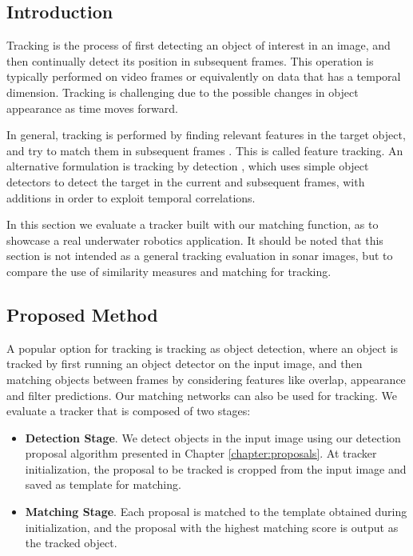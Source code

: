 \subsection{Introduction}

Tracking is the process of first detecting an object of interest in an image, and then continually detect its position in subsequent frames. This operation is typically performed on video frames or equivalently on data that has a temporal dimension. Tracking is challenging due to the possible changes in object appearance as time moves forward.

In general, tracking is performed by finding relevant features in the target object, and try to match them in subsequent frames \cite{yilmaz2006object}. This is called feature tracking. An alternative formulation is tracking by detection \cite[1em]{vcehovin2016visual}, which uses simple object detectors to detect the target in the current and subsequent frames, with additions in order to exploit temporal correlations.

In this section we evaluate a tracker built with our matching function, as to showcase a real underwater robotics application. It should be noted that this section is not intended as a general tracking evaluation in sonar images, but to compare the use of similarity measures and matching for tracking.

\subsection{Proposed Method}

A popular option for tracking is tracking as object detection, where an object is tracked by first running an object detector on the input image, and then matching objects between frames by considering features like overlap, appearance and filter predictions. Our matching networks can also be used for tracking. We evaluate a tracker that is composed of two stages:

\begin{itemize}
	\item \textbf{Detection Stage}. We detect objects in the input image using our detection proposal algorithm presented in Chapter \ref{chapter:proposals}. At tracker initialization, the proposal to be tracked is cropped from the input image and saved as template for matching.
	\item \textbf{Matching Stage}. Each proposal is matched to the template obtained during initialization, and the proposal with the highest matching score is output as the tracked object.
\end{itemize}

